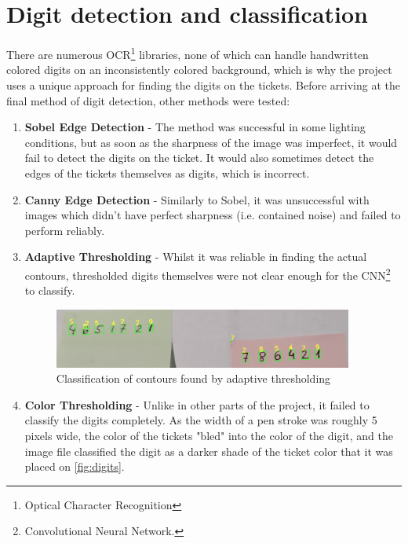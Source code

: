 \documentclass[12pt]{report}
\theoremstyle{definition}
\theoremstyle{remark}
\begin{document}
\section{Digit detection and classification}
There are numerous OCR\footnote{Optical Character Recognition} libraries, none of which can handle handwritten colored digits on an inconsistently colored background, which is why the project uses a unique approach for finding the digits on the tickets. Before arriving at the final method of digit detection, other methods were tested:

\begin{enumerate}
    \item \textbf{Sobel Edge Detection} - The method was successful in some lighting conditions, but as soon as the sharpness of the image was imperfect, it would fail to detect the digits on the ticket. It would also sometimes detect the edges of the tickets themselves as digits, which is incorrect.
    \item \textbf{Canny Edge Detection} - Similarly to Sobel, it was unsuccessful with images which didn't have perfect sharpness (i.e. contained noise) and failed to perform reliably.
    \item \textbf{Adaptive Thresholding} - Whilst it was reliable in finding the actual contours, thresholded digits themselves were not clear enough for the CNN\footnote{Convolutional Neural Network.} to classify.
    \begin{figure}[h]
        \includegraphics[width=0.93\textwidth,right]{img/adaptive_classification.png}
        \caption{Classification of contours found by adaptive thresholding}
    \end{figure}
    \item \textbf{Color Thresholding} - Unlike in other parts of the project, it failed to classify the digits completely. As the width of a pen stroke was roughly 5 pixels wide, the color of the tickets "bled" into the color of the digit, and the image file classified the digit as a darker shade of the ticket color that it was placed on \ref{fig:digits}.
    

\end{enumerate}
\end{document}
